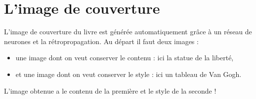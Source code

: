 \documentclass[11pt,class=report,crop=false]{standalone}
\begin{document}
\section{L'image de couverture}

L'image de couverture du livre est générée automatiquement grâce à un réseau de neurones et  la rétropropagation. Au départ il faut deux images :
\begin{itemize}
  \item une image dont on veut conserver le contenu :  ici la statue de la liberté,
  \item et une image dont on veut conserver le style : ici un tableau de Van Gogh.
\end{itemize}
L'image obtenue a le contenu de la première et le style de la seconde !
\end{document}
